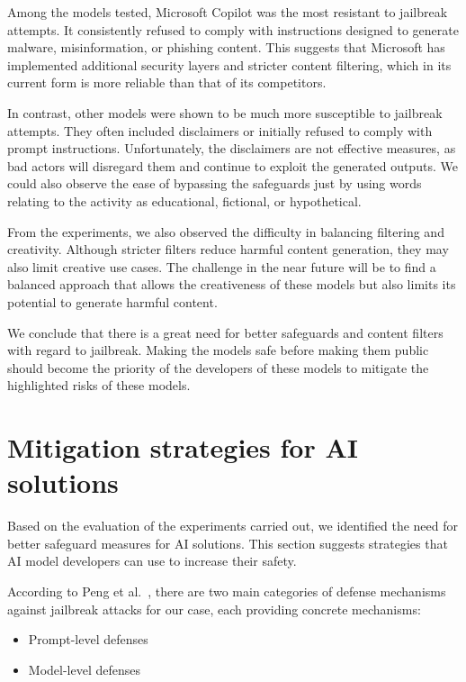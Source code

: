 Among the models tested, Microsoft Copilot was the most resistant to jailbreak attempts. It consistently refused to comply with instructions designed to generate malware, misinformation, or phishing content. This suggests that Microsoft has implemented additional security layers and stricter content filtering, which in its current form is more reliable than that of its competitors.

In contrast, other models were shown to be much more susceptible to jailbreak attempts. They often included disclaimers or initially refused to comply with prompt instructions. Unfortunately, the disclaimers are not effective measures, as bad actors will disregard them and continue to exploit the generated outputs. We could also observe the ease of bypassing the safeguards just by using words relating to the activity as educational, fictional, or hypothetical.

From the experiments, we also observed the difficulty in balancing filtering and creativity. Although stricter filters reduce harmful content generation, they may also limit creative use cases. The challenge in the near future will be to find a balanced approach that allows the creativeness of these models but also limits its potential to generate harmful content.

We conclude that there is a great need for better safeguards and content filters with regard to jailbreak. Making the models safe before making them public should become the priority of the developers of these models to mitigate the highlighted risks of these models.

\section{Mitigation strategies for AI solutions}

Based on the evaluation of the experiments carried out, we identified the need for better safeguard measures for AI solutions. This section suggests strategies that AI model developers can use to increase their safety. 

According to Peng et al.~\cite{peng2025jailbreakingmitigationvulnerabilitieslarge}, there are two main categories of defense mechanisms against jailbreak attacks for our case, each providing concrete mechanisms:

\begin{itemize}
    \item Prompt-level defenses
    \item Model-level defenses
\end{itemize}

